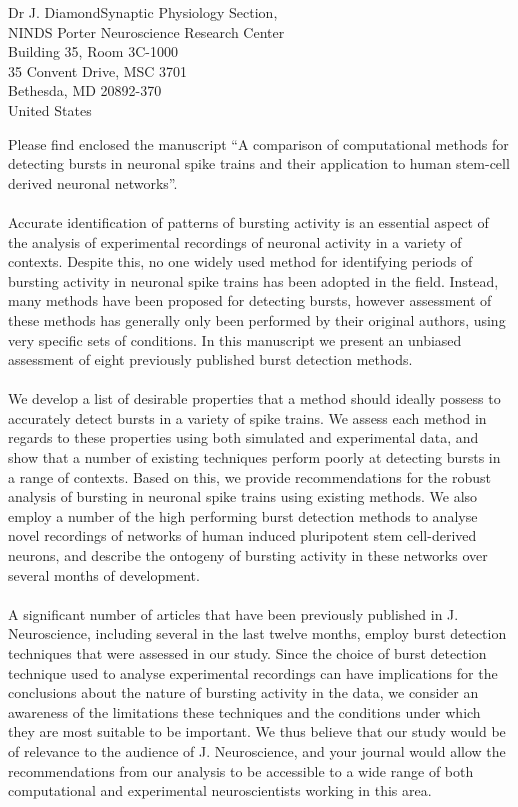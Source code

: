 \documentclass[usebwarms,a4paper,nofold]{damtplet}
\begin{document}
\begin{letter}{Dr J. Diamond}{Synaptic Physiology Section, \\ NINDS
Porter Neuroscience Research Center \\
Building 35, Room 3C-1000 \\
35 Convent Drive, MSC 3701  \\
Bethesda, MD 20892-370 \\
United States}
%
%
{

 Please find enclosed the manuscript ``A comparison of computational methods for detecting bursts in neuronal spike trains and their application to human stem-cell derived neuronal networks''. 
 \\ \\Accurate identification of patterns of bursting activity is an essential aspect of the analysis of experimental recordings of neuronal activity in a variety of contexts. Despite this, no one widely used method for identifying periods of bursting activity in neuronal spike trains has been adopted in the field. Instead, many methods have been proposed for detecting bursts, however assessment of these methods has generally only been performed by their original authors, using very specific sets of conditions. In this manuscript we present an unbiased assessment of eight previously published burst detection methods. 
 \\ \\We develop a list of desirable properties that a method should ideally possess to accurately detect bursts in a variety of spike trains. We assess each method in regards to these properties using both simulated and experimental data, and show that a number of existing techniques perform poorly at detecting bursts in a range of contexts. Based on this, we provide recommendations for the robust analysis of bursting in neuronal spike trains using existing methods. We also employ a number of the high performing burst detection methods to analyse novel recordings of networks of human induced pluripotent stem cell-derived neurons, and describe the ontogeny of bursting activity in these networks over several months of development.
  \\ \\A significant number of articles that have been previously published in J. Neuroscience, including several in the last twelve months, employ burst detection techniques that were assessed in our study. Since the choice of burst detection technique used to analyse experimental recordings can have implications for the conclusions about the nature of bursting activity in the data, we consider an awareness of the limitations these techniques and the conditions under which they are most suitable to be important. We thus believe that our study would be of relevance to the audience of J. Neuroscience, and your journal would allow the recommendations from our analysis to be accessible to a wide range of both computational and experimental neuroscientists working in this area.
}
\end{letter}
\end{document}
